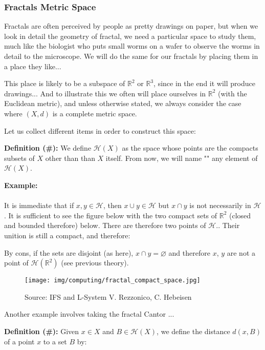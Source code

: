 	\subsubsection{Fractals Metric Space}\label{fractal metric space}
	Fractals are often perceived by people as pretty drawings on paper, but when we look in detail the geometry of fractal, we need a particular space to study them, much like the biologist who puts small worms on a wafer to observe the worms in detail to the microscope. We will do the same for our fractals by placing them in a place they like...
	
	This place is likely to be a subspace of $\mathbb{R}^2$ or  $\mathbb{R}^3$, since in the end it will produce drawings... And to illustrate this we often will place ourselves in  $\mathbb{R}^2$ (with the Euclidean metric), and unless otherwise stated, we always consider the case where $(X,d)$ is a complete metric space.
	
	Let us collect different items in order to construct this space:
	
	\textbf{Definition (\#\mydef):} We define $\mathcal{H}(X)$ as the space whose points are the compacts subsets of $X$ other than than $X$ itself. From now, we will name "" any element of $\mathcal{H}(X)$.
	
	\begin{tcolorbox}[colframe=black,colback=white,sharp corners]
	\textbf{{\Large {}}Example:}\\\\
	It is immediate that if $x,y\in\mathcal{H}$, then $x\cup y\in \mathcal{H}$ but $x\cap y$ is not necessarily in $\mathcal{H}$. It is sufficient to see the figure below with the two compact sets of $\mathbb{R}^2$ (closed and bounded therefore) below. There are therefore two points of $\mathcal{H}$.. Their unition is still a compact, and therefore:
	

	By cons, if the sets are disjoint (as here), $x\cap y=\varnothing$ and therefore $x$, $y$ are not a point of $\mathcal{H}(\mathbb{R}^2)$ (see previous theory).
	\begin{figure}[H]
		\centering
		\texttt{[image: img/computing/fractal\_compact\_space.jpg]}
		\caption[]{Source: IFS and L-System V. Rezzonico, C. Hebeisen}
	\end{figure}
	\end{tcolorbox}
	Another example involves taking the fractal Cantor ...
	
	\textbf{Definition (\#\mydef):} Given $x\in X$ and $B\in\mathcal{H}(X)$, we define the distance $d(x,B)$ of a point $x$ to a set $B$  by:
	
